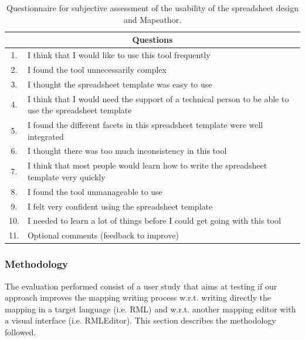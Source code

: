 \begin{table}[t!]
\caption{Questionnaire for subjective assessment of the usability of the spreadsheet design and Mapeathor. }
\centering
\label{tab:chp5-1_sub_questionnaire}
\resizebox{\columnwidth}{!}
{\begin{tabular}{cl}
\multicolumn{2}{c}{\textbf{Questions}} \\ \midrule
1. & I think that I would like to use this tool frequently\\ \midrule
2. & I found the tool unnecessarily complex\\ \midrule
3. & I thought the spreadsheet template was easy to use\\ \midrule
4. & I think that I would need the support of a technical person to be able to use the spreadsheet template\\ \midrule
5. & I found the different facets in this spreadsheet template were well integrated\\ \midrule
6. & I thought there was too much inconsistency in this tool\\ \midrule
7. & I think that most people would learn how to write the spreadsheet template very quickly\\ \midrule
8. & I found the tool unmanageable to use\\ \midrule
9. & I felt very confident using the spreadsheet template\\ \midrule
10. & I needed to learn a lot of things before I could get going with this tool\\ \midrule
11. & Optional comments (feedback to improve) \\ \bottomrule
\end{tabular}}
\end{table}

\subsubsection{Methodology}
\label{sec:chp5_mapeathor_eval_method}

The evaluation performed consist of a user study that aims at
testing if our approach improves the mapping writing process w.r.t. writing directly the mapping in a target language (i.e. RML) and w.r.t. another mapping editor with a visual interface (i.e. RMLEditor). This section describes the methodology followed.


